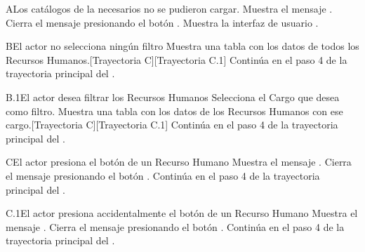 \begin{UCtrayectoriaA}{A}{Los catálogos de la  necesarios no se pudieron cargar.}
    \UCpaso Muestra el mensaje .
    \UCpaso[\UCactor] Cierra el mensaje presionando el botón .
    \UCpaso Muestra la interfaz de usuario .
\end{UCtrayectoriaA}
\begin{UCtrayectoriaA}{B}{El actor no selecciona ningún filtro}
    \UCpaso Muestra una tabla con los datos de todos los Recursos Humanos.[Trayectoria C][Trayectoria C.1]
    \UCpaso Continúa en el paso 4 de la trayectoria principal del .
\end{UCtrayectoriaA}
\begin{UCtrayectoriaA}{B.1}{El actor desea filtrar los Recursos Humanos}
    \UCpaso[\UCactor] Selecciona el Cargo que desea como filtro.
    \UCpaso Muestra una tabla con los datos de los Recursos Humanos con ese cargo.[Trayectoria C][Trayectoria C.1]
    \UCpaso Continúa en el paso 4 de la trayectoria principal del .
\end{UCtrayectoriaA}
\begin{UCtrayectoriaA}{C}{El actor presiona el botón  de un Recurso Humano}
    \UCpaso Muestra el mensaje .
    \UCpaso[\UCactor] Cierra el mensaje presionando el botón .
    \UCpaso Continúa en el paso 4 de la trayectoria principal del .
\end{UCtrayectoriaA}
\begin{UCtrayectoriaA}{C.1}{El actor presiona accidentalmente el botón  de un Recurso Humano}
    \UCpaso Muestra el mensaje .
    \UCpaso[\UCactor] Cierra el mensaje presionando el botón .
    \UCpaso Continúa en el paso 4 de la trayectoria principal del .
\end{UCtrayectoriaA}